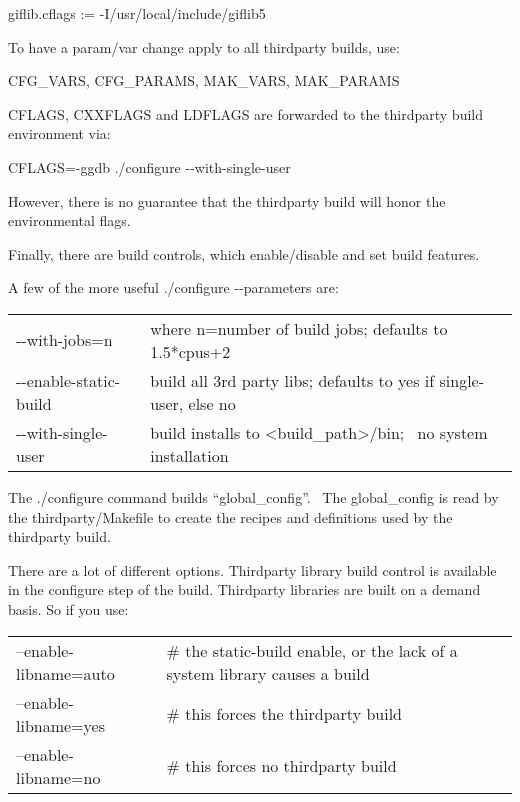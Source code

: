 \hspace{2em}giflib.cflags := -I/usr/local/include/giflib5
\medskip

To have a param/var change apply to all thirdparty builds, use:
\medskip

\hspace{2em}CFG\_VARS, CFG\_PARAMS, MAK\_VARS, MAK\_PARAMS
\medskip

CFLAGS, CXXFLAGS and LDFLAGS are forwarded to the thirdparty build environment via:
\medskip

\hspace{2em}CFLAGS=-ggdb ./configure -{}-with-single-user
\medskip

However, there is no guarantee that the thirdparty build will honor the environmental flags.

Finally, there are build controls, which enable/disable and set build features.
\bigskip

A few of the more useful ./configure -{}-parameters are:
\smallskip

\hspace{2em}
\begin{tabular}{@{}ll}
	{}-{}-with-jobs=n & where n=number of build jobs; defaults to 1.5*cpus+2\\
	{}-{}-enable-static-build & build all 3rd party libs; defaults to yes if single-user, else no\\
	{}-{}-with-single-user& build installs to {\textless}build\_path{\textgreater}/bin; \ no system installation\\
\end{tabular}

\medskip

The ./configure command builds ``global\_config''. \ The global\_config is read by the thirdparty/Makefile to create the recipes and definitions used by the thirdparty build.
\medskip

There are a lot of different options.  Thirdparty library build control is available in the configure step of the build.  Thirdparty libraries are built on a demand basis.  So if you use:
\medskip

\hspace{2em}
\begin{tabular}{@{}ll}
  --enable-libname=auto & \# the static-build enable, or the lack of a system library causes a build\\
  --enable-libname=yes  &  \# this forces the thirdparty build\\
  --enable-libname=no   &  \# this forces no thirdparty build\\
\end{tabular}
\medskip

